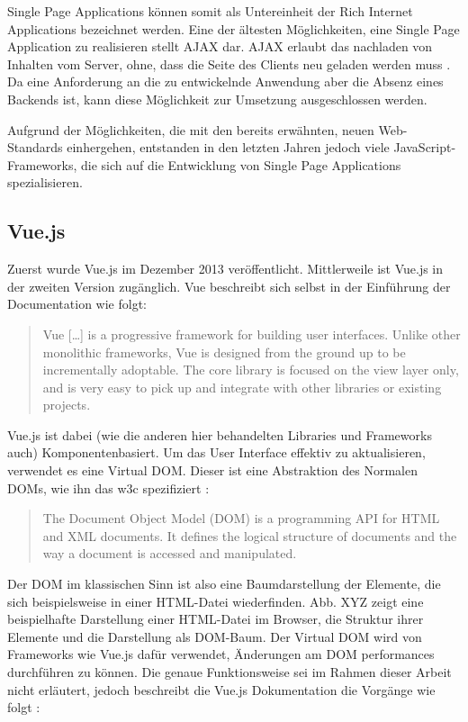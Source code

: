 Single Page Applications können somit als Untereinheit der Rich Internet Applications bezeichnet werden.
Eine der ältesten Möglichkeiten, eine Single Page Application zu realisieren stellt AJAX dar. AJAX erlaubt das nachladen von Inhalten  vom Server, ohne, dass die Seite des Clients neu geladen werden muss \cite{paulson2005building}. Da eine Anforderung an die zu entwickelnde Anwendung aber die Absenz eines Backends ist, kann diese Möglichkeit zur Umsetzung ausgeschlossen werden.

Aufgrund der Möglichkeiten, die mit den bereits erwähnten, neuen Web-Standards einhergehen, entstanden in den letzten Jahren jedoch viele JavaScript-Frameworks, die sich auf die Entwicklung von Single Page Applications spezialisieren.

\subsection{Vue.js}
Zuerst wurde Vue.js im Dezember 2013 veröffentlicht. Mittlerweile ist Vue.js in der zweiten Version zugänglich.
Vue beschreibt sich selbst in der Einführung der Documentation wie folgt:

\begin{quote}
  Vue […] is a progressive framework for building user interfaces. Unlike other monolithic frameworks, Vue is designed from the ground up to be incrementally adoptable. The core library is focused on the view layer only, and is very easy to pick up and integrate with other libraries or existing projects. \cite{VueIntro}
\end{quote}

Vue.js ist dabei (wie die anderen hier behandelten Libraries und Frameworks auch) Komponentenbasiert. Um das User Interface effektiv zu aktualisieren, verwendet es eine Virtual DOM. Dieser ist eine Abstraktion des Normalen DOMs, wie ihn das w3c spezifiziert \cite{w3cDOM}:

\begin{quote}
  The Document Object Model (DOM) is a programming API for HTML and XML documents. It defines the logical structure of documents and the way a document is accessed and manipulated.
\end{quote}

Der DOM im klassischen Sinn ist also eine Baumdarstellung der Elemente, die sich beispielsweise in einer HTML-Datei wiederfinden. Abb. XYZ zeigt eine beispielhafte Darstellung einer HTML-Datei im Browser, die Struktur ihrer Elemente und die Darstellung als DOM-Baum.
Der Virtual DOM wird von Frameworks wie Vue.js dafür verwendet, Änderungen am DOM performances durchführen zu können. Die genaue Funktionsweise sei im Rahmen dieser Arbeit nicht erläutert,  jedoch beschreibt die Vue.js Dokumentation die Vorgänge wie folgt \cite{VueTemplate}:

